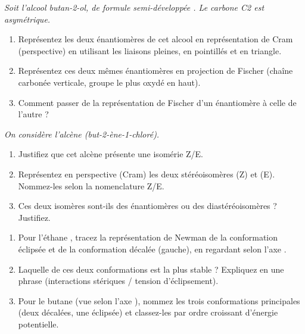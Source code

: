 \documentclass[11pt]{article}
\begin{document}
\begin{exercice}
\emph{Soit l'alcool butan-2-ol, de formule semi-développée . Le carbone C2 est asymétrique.}
\begin{enumerate}
    \item Représentez les deux énantiomères de cet alcool en représentation de Cram (perspective) en utilisant les liaisons pleines, en pointillés et en triangle.
    \item Représentez ces deux mêmes énantiomères en projection de Fischer (chaîne carbonée verticale, groupe le plus oxydé en haut).
    \item Comment passer de la représentation de Fischer d'un énantiomère à celle de l'autre ?
\end{enumerate}
\end{exercice}

\begin{exercice}
\emph{On considère l'alcène  (but-2-ène-1-chloré).}
\begin{enumerate}
    \item Justifiez que cet alcène présente une isomérie Z/E.
    \item Représentez en perspective (Cram) les deux stéréoisomères (Z) et (E). Nommez-les selon la nomenclature Z/E.
    \item Ces deux isomères sont-ils des énantiomères ou des diastéréoisomères ? Justifiez.
\end{enumerate}
\end{exercice}

\begin{exercice}
\begin{enumerate}
    \item Pour l'éthane , tracez la représentation de Newman de la conformation éclipsée et de la conformation décalée (gauche), en regardant selon l'axe .
    \item Laquelle de ces deux conformations est la plus stable ? Expliquez en une phrase (interactions stériques / tension d'éclipsement).
    \item Pour le butane  (vue selon l'axe ), nommez les trois conformations principales (deux décalées, une éclipsée) et classez-les par ordre croissant d'énergie potentielle.
\end{enumerate}
\end{exercice}
\end{document}
